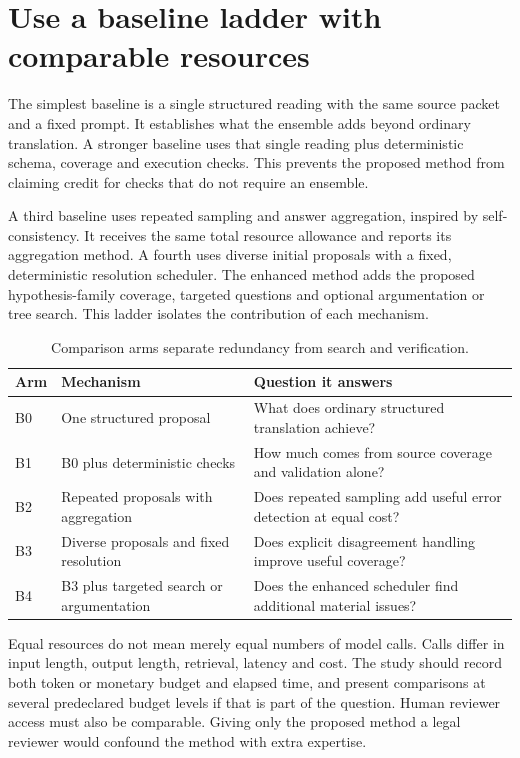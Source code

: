 \section{Use a baseline ladder with comparable resources}
\label{merge:M09:04}


The simplest baseline is a single structured reading with the same source packet
and a fixed prompt. It establishes what the ensemble adds beyond ordinary
translation. A stronger baseline uses that single reading plus deterministic
schema, coverage and execution checks. This prevents the proposed method from
claiming credit for checks that do not require an ensemble.

A third baseline uses repeated sampling and answer aggregation, inspired by
self-consistency. It receives the same total resource allowance and reports its
aggregation method. A fourth uses diverse initial proposals with a fixed,
deterministic resolution scheduler. The enhanced method adds the proposed
hypothesis-family coverage, targeted questions and optional argumentation or tree
search. This ladder isolates the contribution of each mechanism.

\begin{table}[H]
\centering
\caption{Comparison arms separate redundancy from search and verification.}
\begin{tabularx}{\textwidth}{P{16mm}YY}
\toprule
Arm & Mechanism & Question it answers\\
\midrule
B0 & One structured proposal & What does ordinary structured translation achieve?\\
\addlinespace[0.5em]
B1 & B0 plus deterministic checks & How much comes from source coverage and validation alone?\\
\addlinespace[0.5em]
B2 & Repeated proposals with aggregation & Does repeated sampling add useful error detection at equal cost?\\
\addlinespace[0.5em]
B3 & Diverse proposals and fixed resolution & Does explicit disagreement handling improve useful coverage?\\
\addlinespace[0.5em]
B4 & B3 plus targeted search or argumentation & Does the enhanced scheduler find additional material issues?\\
\bottomrule
\end{tabularx}
\end{table}


Equal resources do not mean merely equal numbers of model calls. Calls differ in
input length, output length, retrieval, latency and cost. The study should record
both token or monetary budget and elapsed time, and present comparisons at
several predeclared budget levels if that is part of the question. Human reviewer
access must also be comparable. Giving only the proposed method a legal reviewer
would confound the method with extra expertise.

